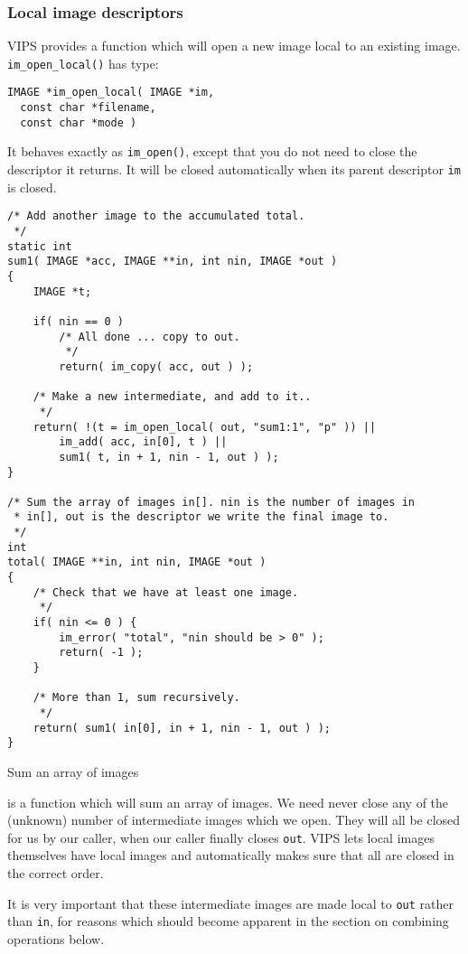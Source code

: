 \subsubsection{Local image descriptors}

VIPS provides a function which will open a new image local to
an existing image. \verb+im_open_local()+ has type:

\begin{verbatim}
IMAGE *im_open_local( IMAGE *im, 
  const char *filename, 
  const char *mode )
\end{verbatim}

It behaves exactly as \verb+im_open()+, except that you do not need to close
the descriptor it returns. It will be closed automatically when its parent
descriptor \verb+im+ is closed. 

\begin{fig2}
\begin{verbatim}
/* Add another image to the accumulated total.
 */
static int
sum1( IMAGE *acc, IMAGE **in, int nin, IMAGE *out )
{
    IMAGE *t;

    if( nin == 0 )
        /* All done ... copy to out.
         */
        return( im_copy( acc, out ) );

    /* Make a new intermediate, and add to it..
     */
    return( !(t = im_open_local( out, "sum1:1", "p" )) || 
        im_add( acc, in[0], t ) || 
        sum1( t, in + 1, nin - 1, out ) );
}

/* Sum the array of images in[]. nin is the number of images in
 * in[], out is the descriptor we write the final image to.
 */
int
total( IMAGE **in, int nin, IMAGE *out )
{
    /* Check that we have at least one image.
     */
    if( nin <= 0 ) {
        im_error( "total", "nin should be > 0" );
        return( -1 );
    }

    /* More than 1, sum recursively.
     */
    return( sum1( in[0], in + 1, nin - 1, out ) );
}
\end{verbatim}
\caption{Sum an array of images}
\label{fg:addemup}
\end{fig2}

 is a function which will sum an array of images.
We need never close any of the (unknown) number of intermediate images which
we open. They will all be closed for us by our caller, when our caller
finally closes \verb+out+. VIPS lets local images themselves have local
images and automatically makes sure that all are closed in the correct order.

It is very important that these intermediate images are made local to
\verb+out+ rather than \verb+in+, for reasons which should become apparent
in the section on combining operations below.

